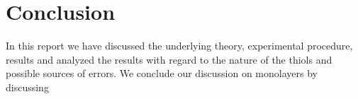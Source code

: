\section{Conclusion}

In this report we have discussed the underlying theory, experimental procedure, results and analyzed the results with regard to the nature of the thiols and possible sources of errors.
We conclude our discussion on monolayers by discussing

